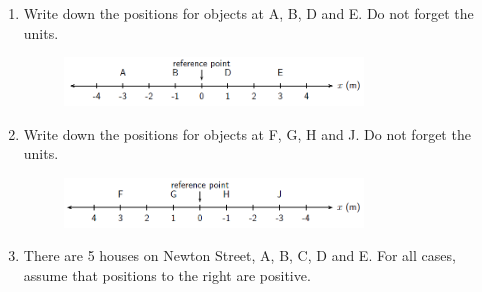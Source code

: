         \label{m38787*id62859}\begin{enumerate}[noitemsep, label=\textbf{\arabic*}. ] 
            \label{m38787*uid11}\item Write down the positions for objects at A, B, D and E. Do not forget the units.

    \setcounter{subfigure}{0}


	\begin{figure}[H] %
    \begin{center}
    \label{m38787*id62877!!!underscore!!!media}\label{m38787*id62877!!!underscore!!!printimage}\includegraphics[width=300px]{col11305.imgs/m38787_PG10C2_005.png} %
        
      \vspace{2pt}
    \vspace{.1in}
    
    \end{center}

 \end{figure}   

    \addtocounter{footnote}{-0}
            \label{m38787*uid12}\item Write down the positions for objects at F, G, H and J. Do not forget the units.

    \setcounter{subfigure}{0}


	\begin{figure}[H] %
    \begin{center}
    \label{m38787*id62899!!!underscore!!!media}\label{m38787*id62899!!!underscore!!!printimage}\includegraphics[width=300px]{col11305.imgs/m38787_PG10C2_006.png} %
        
      \vspace{2pt}
    \vspace{.1in}
    
    \end{center}

 \end{figure}   

    \addtocounter{footnote}{-0}
            \label{m38787*uid13}\item There are 5 houses on Newton Street, A, B, C, D and E. For all cases, assume that positions to the right are positive.


\end{enumerate}
